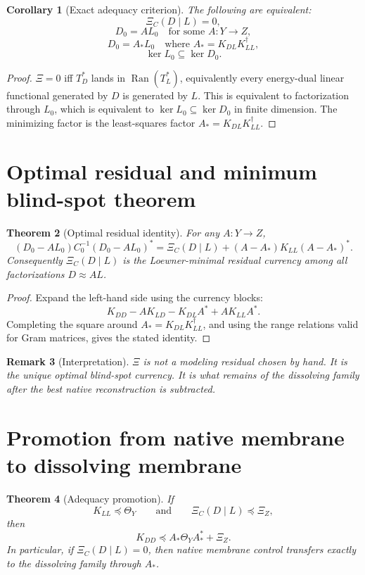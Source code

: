 \documentclass[11pt]{article}
\newtheorem{theorem}{Theorem}[section]
\newtheorem{corollary}[theorem]{Corollary}
\newtheorem{remark}[theorem]{Remark}
\DeclareMathOperator{\Range}{Ran}
\begin{document}
\begin{corollary}[Exact adequacy criterion]
The following are equivalent:
\[
\Xi_C(D\mid L)=0,
\]
\[
D_0=A L_0\quad\text{for some }A:Y\to Z,
\]
\[
D_0=A_*L_0\quad\text{where }A_*=K_{DL}K_{LL}^{\dagger},
\]
\[
\ker L_0\subseteq\ker D_0.
\]
\end{corollary}

\begin{proof}
\(\Xi=0\) iff \(T_D^*\) lands in \(\Range(T_L^*)\), equivalently every energy-dual
linear functional generated by \(D\) is generated by \(L\).  This is equivalent to
factorization through \(L_0\), which is equivalent to \(\ker L_0\subseteq\ker D_0\)
in finite dimension.  The minimizing factor is the least-squares factor
\(A_*=K_{DL}K_{LL}^{\dagger}\).
\end{proof}

\section{Optimal residual and minimum blind-spot theorem}
\begin{theorem}[Optimal residual identity]
For any \(A:Y\to Z\),
\[
\boxed{
(D_0-AL_0)C_0^{-1}(D_0-AL_0)^*
=
\Xi_C(D\mid L)+(A-A_*)K_{LL}(A-A_*)^*.
}
\]
Consequently \(\Xi_C(D\mid L)\) is the Loewner-minimal residual currency among
all factorizations \(D\approx AL\).
\end{theorem}

\begin{proof}
Expand the left-hand side using the currency blocks:
\[
K_{DD}-AK_{LD}-K_{DL}A^*+AK_{LL}A^*.
\]
Completing the square around \(A_*=K_{DL}K_{LL}^{\dagger}\), and using the range
relations valid for Gram matrices, gives the stated identity.
\end{proof}

\begin{remark}[Interpretation]
\(\Xi\) is not a modeling residual chosen by hand.  It is the unique optimal
blind-spot currency.  It is what remains of the dissolving family after the best
native reconstruction is subtracted.
\end{remark}

\section{Promotion from native membrane to dissolving membrane}
\begin{theorem}[Adequacy promotion]
If
\[
K_{LL}\preceq \Theta_Y
\qquad\text{and}\qquad
\Xi_C(D\mid L)\preceq \Xi_Z,
\]
then
\[
\boxed{
K_{DD}\preceq A_*\Theta_YA_*^*+\Xi_Z.
}
\]
In particular, if \(\Xi_C(D\mid L)=0\), then native membrane control transfers
exactly to the dissolving family through \(A_*\).
\end{theorem}
\end{document}
